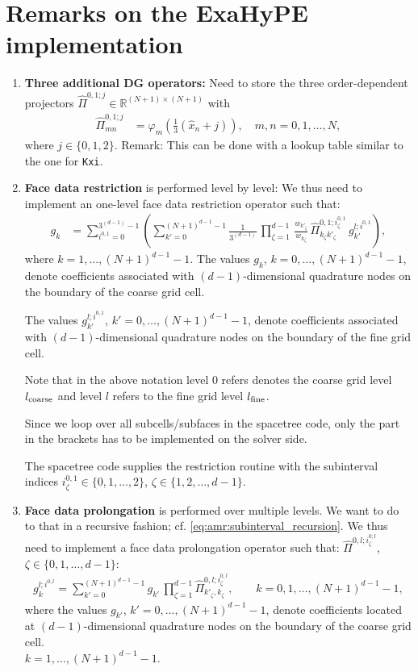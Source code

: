 \documentclass{scrreprt}
\theoremstyle{definition}
\theoremstyle{nonumberplain}
\begin{document}
\section{Remarks on the ExaHyPE implementation}
\begin{enumerate}
  \item \textbf{Three additional DG operators:} Need to store the three
  order-dependent projectors $\hat{\Pi}^{0,1;j}\in\mathbb{R}^{(N+1)\times(N+1)}$
with
\begin{align}
\hat{\Pi}^{0,1;j}_{mn}
&=
\varphi_m \left( \frac{1}{3} (\hat{x}_n+j)\right),
\quad m,n=0,1,\ldots,N,
\end{align}
where $j\in\{0,1,2\}$.
Remark: This can be done with a lookup table similar to the one for \texttt{Kxi}.
\item \textbf{Face data restriction} is performed level by level: We thus
need to implement an one-level face data restriction operator such that:
\begin{align}
g_k &=
\sum_{i^{0,1}=0}^{3^{(d-1)}-1}
\left(
\sum_{k'=0}^{(N+1)^{d-1}-1}
\frac{1}{3^{(d-1)}}\,
\prod_{\zeta=1}^{d-1}\,
\frac{w_{k'_\zeta}}{w_{k_\zeta}}\,
\hat{\Pi}^{0,1;i^{0,1}_\zeta}_{k_\zeta k'_\zeta}
\,
g^{l;i^{0,1}}_{k'}
\right),
\end{align}
where $k=1,\ldots,(N+1)^{d-1}-1$.
The values $g_{k}$, $k=0,\ldots,(N+1)^{d-1}-1$, denote coefficients
associated with $(d-1)$-dimensional quadrature nodes on the boundary
of the coarse grid cell.

The values $g^{l;i^{0,1}}_{k'}$, $k'=0,\ldots,(N+1)^{d-1}-1$, denote
coefficients associated with $(d-1)$-dimensional quadrature nodes on the boundary
of the fine grid cell. 

Note that in the above notation level 0 refers
denotes the coarse grid level $l_\textup{coarse}$ and level $l$ refers to
the fine grid level $l_\textup{fine}$.

Since we loop over all subcells/subfaces in
the spacetree code, only the part in
the brackets has to be implemented on the solver side.

The spacetree code supplies the restriction
routine with the subinterval indices
$i^{0,1}_\zeta\in\{0,1,\ldots,2\}$, $\zeta\in\{1,2,\ldots,d-1\}$.
\item \textbf{Face data prolongation} is performed over multiple levels.
We want to do to that in a recursive fashion; cf.
\eqref{eq:amr:subinterval_recursion}.
We thus need to implement a face data prolongation operator such that:
$\hat{\Pi}^{0,l;i^{0;l}_\zeta}$, $\zeta\in\{0,1,\ldots,d-1\}$:
\begin{align}
g^{l;i^{0,l}}_k = \sum_{k'=0}^{(N+1)^{d-1}-1} g_{k'}\,\prod_{\zeta=1}^{d-1}
\hat{\Pi}^{0,l;i^{0,l}_\zeta}_{k'_\zeta,k_\zeta},\qquad k = 0,1,\ldots,(N+1)^{d-1}-1,
\end{align}
where the values $g_{k'}$, $k'=0,\ldots,(N+1)^{d-1}-1$, denote coefficients
located at $(d-1)$-dimensional quadrature nodes on the boundary
of the coarse grid cell.
\\ 
${k=1,\ldots,(N+1)^{d-1}-1}$.


\end{enumerate}
\end{document}
